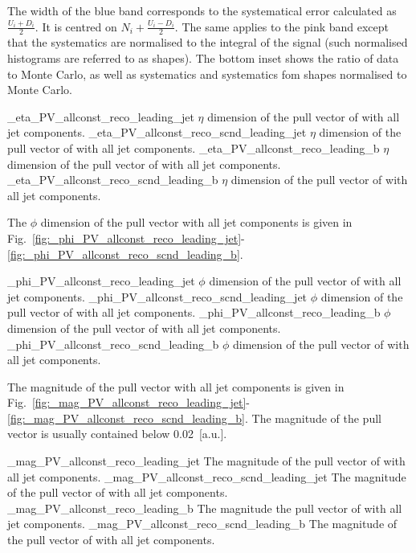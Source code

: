 The width of the blue band corresponds to the systematical error calculated as $\frac{U_{i}+D_{i}}{2}$. It is centred on $N_{i}+\frac{U_{i}-D_{i}}{2}$. The same applies to the pink band except that the systematics are normalised to the integral of the signal (such normalised histograms are referred to as shapes). The bottom inset shows the ratio of data to Monte Carlo, as well as systematics and systematics fom shapes normalised to Monte Carlo.

          {_eta_PV_allconst_reco_leading_jet}
          {$\eta$ dimension of the pull vector of \leadingjet with all jet components.}
          {_eta_PV_allconst_reco_scnd_leading_jet}
          {$\eta$ dimension of the pull vector of \scndleadingjet with all jet components.}
          {_eta_PV_allconst_reco_leading_b}
          {$\eta$ dimension of the pull vector of \leadingb with all jet components.}
          {_eta_PV_allconst_reco_scnd_leading_b}
          {$\eta$ dimension of the pull vector of \scndleadingb with all jet components.}

The $\phi$ dimension of the pull vector with all jet components is given in Fig.~\ref{fig:_phi_PV_allconst_reco_leading_jet}-\ref{fig:_phi_PV_allconst_reco_scnd_leading_b}. 

          {_phi_PV_allconst_reco_leading_jet}
          {$\phi$ dimension of the pull vector of \leadingjet with all jet components.}
          {_phi_PV_allconst_reco_scnd_leading_jet}
          {$\phi$ dimension of the pull vector of \scndleadingjet with all jet components.}
          {_phi_PV_allconst_reco_leading_b}
          {$\phi$ dimension of the pull vector of \leadingb with all jet components.}
          {_phi_PV_allconst_reco_scnd_leading_b}
          {$\phi$ dimension of the pull vector of \scndleadingb with all jet components.}

The magnitude of the pull vector with all jet components is given in Fig.~\ref{fig:_mag_PV_allconst_reco_leading_jet}-\ref{fig:_mag_PV_allconst_reco_scnd_leading_b}. The magnitude of the pull vector is usually contained below 0.02~[a.u.].

          {_mag_PV_allconst_reco_leading_jet}
          {The magnitude of the pull vector of \leadingjet with all jet components.}
          {_mag_PV_allconst_reco_scnd_leading_jet}
          {The magnitude of the pull vector of \scndleadingjet with all jet components.}
          {_mag_PV_allconst_reco_leading_b}
          {The magnitude the pull vector of \leadingb with all jet components.}
          {_mag_PV_allconst_reco_scnd_leading_b}
          {The magnitude of the pull vector of \scndleadingb with all jet components.}

